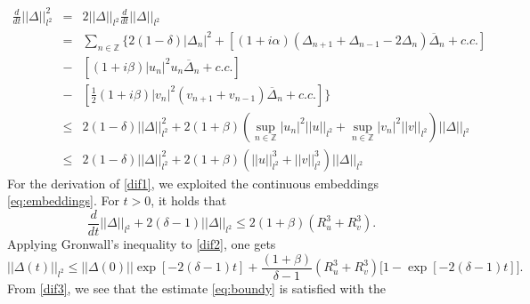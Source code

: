 \documentclass[preprintnumbers,amsmath,amssymb]{revtex4}
\begin{document}
\begin{eqnarray}
\label{dif1}
  \frac{d}{dt}|| \Delta||_{l^2}^2&=&2|| \Delta||_{l^2} \frac{d}{dt}|| \Delta||_{l^2}\nonumber\\
&=&  \sum_{n \in {\mathbb{Z}}}\bigg\{ 2(1-\delta) |\Delta_n|^2+[(1+i\alpha)(\Delta_{n+1}+\Delta_{n-1}-2\Delta_n)\overline{\Delta}_n  +c.c.]\nonumber\\
&-&[(1+i\beta)|u_n|^2u_n \overline{\Delta}_n  +c.c.]\nonumber\\
&-&\left[\frac{1}{2}(1+i\beta)|v_n|^2(v_{n+1}+v_{n-1})\overline{\Delta}_n   
 +c.c.\right]\bigg\}\nonumber\\
&\le& 2(1-\delta) || \Delta||_{l^2}^2+
2(1+\beta)( \sup_{n \in {\mathbb{Z}}}|u_n|^2 || u||_{l^2} + 
\sup_{n \in {\mathbb{Z}}}|v_n|^2 || v||_{l^2})|| \Delta||_{l^2} \nonumber\\
   &\le& 2(1-\delta) || \Delta||_{l^2}^2+
2(1+\beta)( || u||_{l^2}^3 + 
 || v||_{l^2}^3)|| \Delta||_{l^2} 
\end{eqnarray}
For the derivation of \eqref{dif1}, we exploited the continuous embeddings \eqref{eq:embeddings}.
For $t>0$, it holds that 
\begin{equation}
\label{dif2}
 \frac{d}{dt}|| \Delta||_{l^2}+ 2(\delta-1) || \Delta||_{l^2}\leq 2(1+\beta)(R_u^3+R_v^3).
\end{equation}
Applying Gronwall's inequality to \eqref{dif2}, one gets
\begin{equation}
 \label{dif3}
 ||\Delta(t)||_{l^2}\leq ||\Delta (0)||\exp[-2(\delta-1)t]+\frac{(1+\beta)}{\delta-1}(R^3_u+R^3_v)\big[1-\exp[-2(\delta-1)t]\big].
\end{equation}
From \eqref{dif3}, we see that the estimate \eqref{eq:boundy} is satisfied with the 
\end{document}
